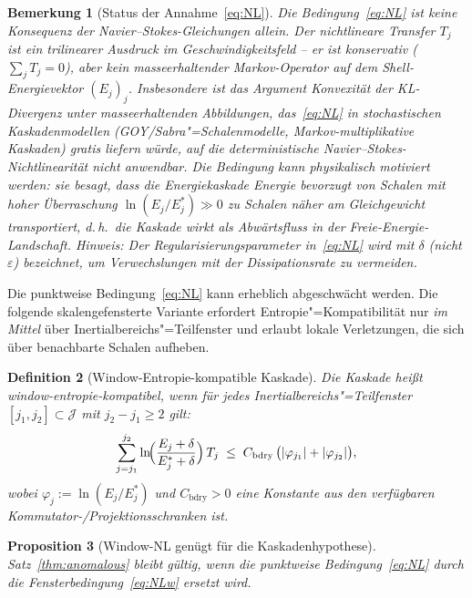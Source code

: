 \documentclass[12pt,a4paper]{article}
\theoremstyle{breakdef}
\newtheorem{definition}{Definition}[section]
\theoremstyle{breakplain}
\newtheorem{proposition}[definition]{Proposition}
\theoremstyle{breakdef}
\newtheorem{remark}[definition]{Bemerkung}
\begin{document}
\begin{remark}[Status der Annahme~\eqref{eq:NL}]
Die Bedingung~\eqref{eq:NL} ist \emph{keine} Konsequenz der
Navier--Stokes-Gleichungen allein. Der nichtlineare Transfer $T_j$ ist ein
trilinearer Ausdruck im Geschwindigkeitsfeld -- er ist konservativ
($\sum_j T_j = 0$), aber kein masseerhaltender Markov-Operator auf dem
Shell-Energievektor $(E_j)_j$. Insbesondere ist das Argument
\glqq Konvexität der KL-Divergenz unter masseerhaltenden Abbildungen\grqq{},
das~\eqref{eq:NL} in stochastischen Kaskadenmodellen (GOY/Sabra"=Schalenmodelle,
Markov-multiplikative Kaskaden) gratis liefern würde, auf die
deterministische Navier--Stokes-Nichtlinearität nicht anwendbar. Die
Bedingung kann physikalisch motiviert werden: sie besagt, dass die
Energiekaskade Energie bevorzugt von Schalen mit hoher Überraschung
$\ln(E_j/E_j^*) \gg 0$ zu Schalen näher am Gleichgewicht transportiert,
d.\,h.\ die Kaskade wirkt als \glqq Abwärtsfluss\grqq{} in der
Freie-Energie-Landschaft.
Hinweis: Der Regularisierungsparameter in~\eqref{eq:NL} wird mit $\delta$
(nicht $\varepsilon$) bezeichnet, um Verwechslungen mit der Dissipationsrate
zu vermeiden.
\end{remark}

Die punktweise Bedingung~\eqref{eq:NL} kann erheblich abgeschwächt werden.
Die folgende skalengefensterte Variante erfordert Entropie"=Kompatibilität
nur \emph{im Mittel} über Inertialbereichs"=Teilfenster und erlaubt lokale
Verletzungen, die sich über benachbarte Schalen aufheben.

\begin{definition}[Window-Entropie-kompatible Kaskade]\label{def:NLw}
Die Kaskade heißt \emph{window-entropie-kompatibel}, wenn für jedes
Inertialbereichs"=Teilfenster $[j_1, j_2] \subset \mathcal{J}$ mit
$j_2 - j_1 \ge 2$ gilt:
\begin{equation}\label{eq:NLw}
  \sum_{j=j_1}^{j_2}
  \ln\!\Bigl(\frac{E_j + \delta}{E_j^* + \delta}\Bigr)\,T_j
  \;\le\;
  C_{\mathrm{bdry}}\,
  \bigl(|\varphi_{j_1}| + |\varphi_{j_2}|\bigr),
\end{equation}
wobei $\varphi_j := \ln(E_j/E_j^*)$ und $C_{\mathrm{bdry}} > 0$ eine
Konstante aus den verfügbaren Kommutator-/Projektionsschranken ist.
\end{definition}

\begin{proposition}[Window-NL genügt für die Kaskadenhypothese]
\label{prop:window-NL}
Satz~\ref{thm:anomalous} bleibt gültig, wenn die punktweise
Bedingung~\eqref{eq:NL} durch die Fensterbedingung~\eqref{eq:NLw}
ersetzt wird.
\end{proposition}
\end{document}
